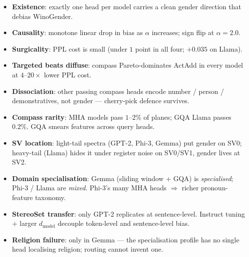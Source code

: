 \documentclass[11pt]{article}
\begin{document}
\noindent
\begin{minipage}[t]{0.49\linewidth}
\begin{tcolorbox}[keybox, title=What replicates across all four]
\begin{itemize}
    \item \textbf{Existence}: exactly one head per model carries a clean gender direction that debias WinoGender.
    \item \textbf{Causality}: monotone linear drop in bias as $\alpha$ increases; sign flip at $\alpha{=}2.0$.
    \item \textbf{Surgicality}: PPL cost is small (under $1$ point in all four; $+0.035$ on Llama).
    \item \textbf{Targeted beats diffuse}: compass Pareto-dominates ActAdd in every model at $4$--$20\times$ lower PPL cost.
    \item \textbf{Dissociation}: other passing compass heads encode number / person / demonstratives, not gender --- cherry-pick defence survives.
\end{itemize}
\end{tcolorbox}
\end{minipage}%
\hfill
\begin{minipage}[t]{0.49\linewidth}
\begin{tcolorbox}[keybox, title=What varies --- and why the architecture explains it]
\begin{itemize}
    \item \textbf{Compass rarity}: MHA models pass $1\text{--}2\%$ of planes; GQA Llama passes $0.2\%$. GQA smears features across query heads.
    \item \textbf{SV location}: light-tail spectra (GPT-2, Phi-3, Gemma) put gender on SV0; heavy-tail (Llama) hides it under register noise on SV0/SV1, gender lives at SV2.
    \item \textbf{Domain specialisation}: Gemma (sliding window + GQA) is \emph{specialised}; Phi-3 / Llama are \emph{mixed}. Phi-3's many MHA heads $\Rightarrow$ richer pronoun-feature taxonomy.
    \item \textbf{StereoSet transfer}: only GPT-2 replicates at sentence-level. Instruct tuning + larger $d_\text{model}$ decouple token-level and sentence-level bias.
    \item \textbf{Religion failure}: only in Gemma --- the specialisation profile has no single head localising religion; routing cannot invent one.
\end{itemize}
\end{tcolorbox}
\end{minipage}
\end{document}
